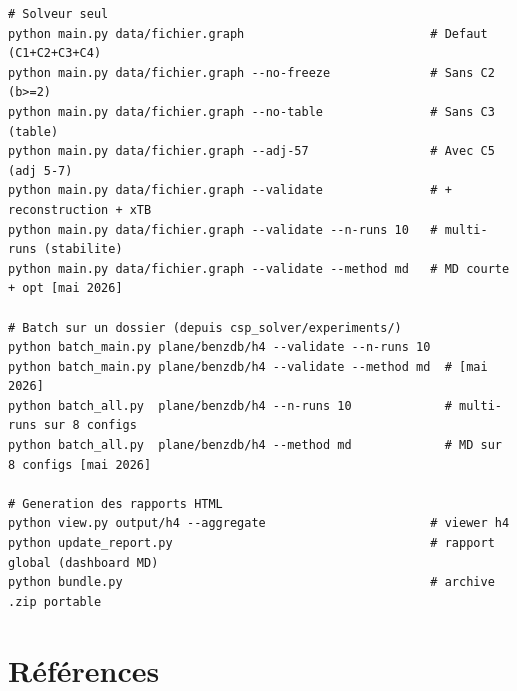 \documentclass[12pt,a4paper]{article}
\theoremstyle{definition}
\begin{document}
\begin{lstlisting}[style=benzai]
# Solveur seul
python main.py data/fichier.graph                          # Defaut (C1+C2+C3+C4)
python main.py data/fichier.graph --no-freeze              # Sans C2 (b>=2)
python main.py data/fichier.graph --no-table               # Sans C3 (table)
python main.py data/fichier.graph --adj-57                 # Avec C5 (adj 5-7)
python main.py data/fichier.graph --validate               # + reconstruction + xTB
python main.py data/fichier.graph --validate --n-runs 10   # multi-runs (stabilite)
python main.py data/fichier.graph --validate --method md   # MD courte + opt [mai 2026]

# Batch sur un dossier (depuis csp_solver/experiments/)
python batch_main.py plane/benzdb/h4 --validate --n-runs 10
python batch_main.py plane/benzdb/h4 --validate --method md  # [mai 2026]
python batch_all.py  plane/benzdb/h4 --n-runs 10             # multi-runs sur 8 configs
python batch_all.py  plane/benzdb/h4 --method md             # MD sur 8 configs [mai 2026]

# Generation des rapports HTML
python view.py output/h4 --aggregate                       # viewer h4
python update_report.py                                    # rapport global (dashboard MD)
python bundle.py                                           # archive .zip portable
\end{lstlisting}

\section*{Références}
\end{document}
